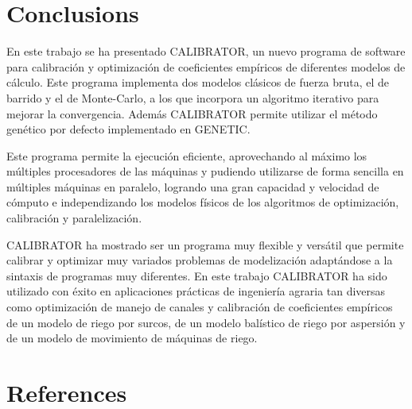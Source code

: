 \documentclass[review,authoryear]{elsarticle}
\begin{document}
\section{Conclusions}

En este trabajo se ha presentado CALIBRATOR, un nuevo programa de software para
calibración y optimización de coeficientes empíricos de diferentes modelos de
cálculo. Este programa implementa dos modelos clásicos de fuerza bruta, el de
barrido y el de Monte-Carlo, a los que incorpora un algoritmo iterativo para
mejorar la convergencia. Además CALIBRATOR permite utilizar el método genético
por defecto implementado en GENETIC.

Este programa permite la ejecución eficiente, aprovechando al máximo los
múltiples procesadores de las máquinas y pudiendo utilizarse de forma sencilla
en múltiples máquinas en paralelo, logrando una gran capacidad y velocidad de
cómputo e independizando los modelos físicos de los algoritmos de optimización,
calibración y paralelización.

CALIBRATOR ha mostrado ser un programa muy flexible y versátil que permite
calibrar y optimizar muy variados problemas de modelización adaptándose a la
sintaxis de programas muy diferentes. En este trabajo CALIBRATOR ha sido
utilizado con éxito en aplicaciones prácticas de ingeniería agraria tan diversas
como optimización de manejo de canales y calibración de coeficientes empíricos
de un modelo de riego por surcos, de un modelo balístico de riego por aspersión
y de un modelo de movimiento de máquinas de riego.

\section*{References}

\end{document}
